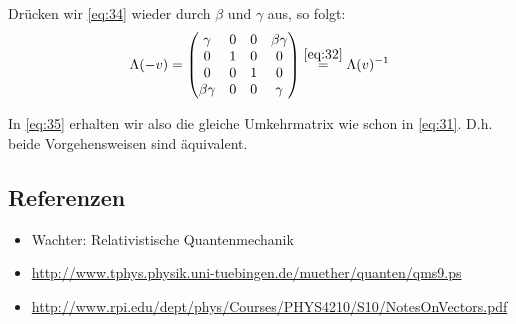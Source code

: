 Drücken wir \eqref{eq:34} wieder durch \(\beta\) und \(\gamma\) aus, so folgt:
\begin{equation}
  \label{eq:35} 
   \Lambda(-v)=
  \begin{pmatrix}
    \gamma&0&0&\beta\gamma\\
    0&1&0&0\\
    0&0&1&0\\
    \beta\gamma&0&0&\gamma
  \end{pmatrix}\stackrel{\eqref{eq:32}}=\Lambda(v)^{-1}
\end{equation}

In \eqref{eq:35} erhalten wir also die gleiche Umkehrmatrix wie schon in
\eqref{eq:31}. D.h. beide Vorgehensweisen sind äquivalent.


\subsection*{Referenzen}
\begin{itemize}
\item Wachter: Relativistische Quantenmechanik
\item \url{http://www.tphys.physik.uni-tuebingen.de/muether/quanten/qms9.ps}
\item \url{http://www.rpi.edu/dept/phys/Courses/PHYS4210/S10/NotesOnVectors.pdf}
\end{itemize}


